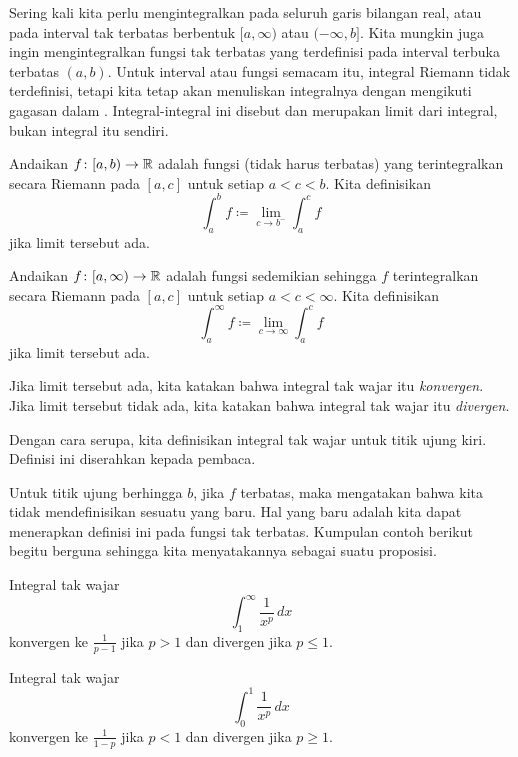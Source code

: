 

Sering kali kita perlu mengintegralkan pada seluruh
garis bilangan real, atau pada interval tak terbatas berbentuk $[a,\infty)$ atau
$(-\infty,b]$.  Kita mungkin juga ingin mengintegralkan fungsi tak terbatas
yang terdefinisi pada interval terbuka terbatas $(a,b)$.
Untuk interval atau fungsi semacam itu, integral Riemann tidak terdefinisi,
tetapi kita tetap akan menuliskan
integralnya dengan mengikuti gagasan dalam .
Integral-integral ini disebut \emph{}
dan merupakan limit
dari integral, bukan integral itu sendiri.

\begin{defn}
Andaikan $f \colon [a,b) \to {\mathbb{R}}$ adalah fungsi (tidak harus terbatas)
yang terintegralkan secara Riemann pada $[a,c]$ untuk setiap $a < c < b$.  Kita definisikan
\begin{equation*}
\int_a^b f \coloneqq \lim_{c \to b^-} \int_a^{c} f
\end{equation*}
jika limit tersebut ada.

Andaikan $f \colon [a,\infty) \to {\mathbb{R}}$ adalah fungsi sedemikian sehingga
$f$ terintegralkan secara Riemann pada $[a,c]$ untuk setiap $a < c < \infty$.
Kita definisikan
\begin{equation*}
\int_a^\infty f \coloneqq \lim_{c \to \infty} \int_a^c f
\end{equation*}
jika limit tersebut ada.

Jika limit tersebut ada, kita katakan bahwa integral tak wajar itu
\emph{konvergen}.
Jika limit tersebut tidak ada, kita katakan bahwa integral tak wajar itu
\emph{divergen}.

Dengan cara serupa, kita definisikan integral tak wajar untuk titik ujung kiri.
Definisi ini diserahkan kepada pembaca.
\end{defn}

Untuk titik ujung berhingga $b$, jika $f$ terbatas, maka
 mengatakan bahwa kita tidak mendefinisikan sesuatu yang baru.  Hal yang baru adalah
kita dapat menerapkan definisi ini pada fungsi tak terbatas.
Kumpulan contoh berikut
begitu berguna sehingga kita menyatakannya sebagai suatu proposisi.

\begin{prop}%
\label{impropriemann:ptest}
Integral tak wajar
\begin{equation*}
\int_1^\infty \frac{1}{x^p} \,dx
\end{equation*}
konvergen ke $\frac{1}{p-1}$ jika $p > 1$ dan divergen jika $p \leq 1$.

Integral tak wajar
\begin{equation*}
\int_0^1 \frac{1}{x^p} \,dx
\end{equation*}
konvergen ke $\frac{1}{1-p}$ jika $p < 1$ dan divergen jika $p \geq 1$.
\end{prop}

